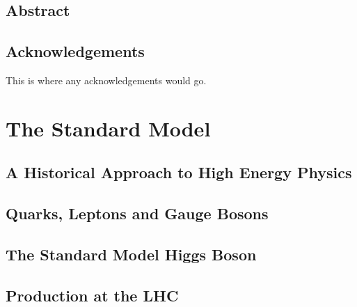 \documentclass[oneside, letterpaper, 12pt, oldfontcommands]{memoir}
\begin{document}
\frontmatter


\thetitlepage
\clearpage

\thecopyrightpage
\cleardoublepage

\setcounter{page}{1}

\section{Abstract}
\uwabstract
\cleardoublepage

\section{Acknowledgements}
This is where any acknowledgements would go.
\clearpage

\tableofcontents* %
 \listoffigures*  %

\mainmatter

\chapter{The Standard Model}
\section{A Historical Approach to High Energy Physics}
\section{Quarks, Leptons and Gauge Bosons}
\section{The Standard Model Higgs Boson}
\section{\bbbar Production at the LHC}
\end{document}
